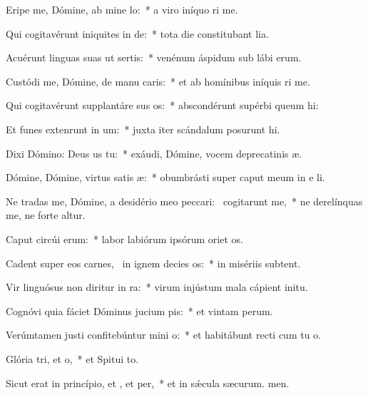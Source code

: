 \item Eripe me, Dómine, ab mine lo:~* a viro iníquo ri me.
\item Qui cogitavérunt iniquites in de:~* tota die constitubant lia.
\item Acuérunt linguas suas ut sertis:~* venénum áspidum sub lábi erum.
\item Custódi me, Dómine, de manu caris:~* et ab homínibus iníquis ri me.
\item Qui cogitavérunt supplantáre sus os:~* abscondérunt supérbi queum hi:
\item Et funes extenrunt in um:~* juxta iter scándalum posurunt hi.
\item Dixi Dómino: Deus us  tu:~* exáudi, Dómine, vocem deprecatinis æ.
\item Dómine, Dómine, virtus satis æ:~* obumbrásti super caput meum in e li.
\item Ne tradas me, Dómine, a desidério meo peccari:~\pscross{} cogitarunt  me,~* ne derelínquas me, ne forte altur.
\item Caput circúi erum:~* labor labiórum ipsórum oriet os.
\item Cadent super eos carnes,~\pscross{} in ignem decies os:~* in misériis  subtent.
\item Vir linguósus non diritur in ra:~* virum injústum mala cápient  initu.
\item Cognóvi quia fáciet Dóminus jucium pis:~* et vintam perum.
\item Verúmtamen justi confitebúntur mini o:~* et habitábunt recti cum tu o.
\item Glória tri, et o,~* et Spitui to.
\item Sicut erat in princípio, et , et per,~* et in sǽcula sæcurum. men.
